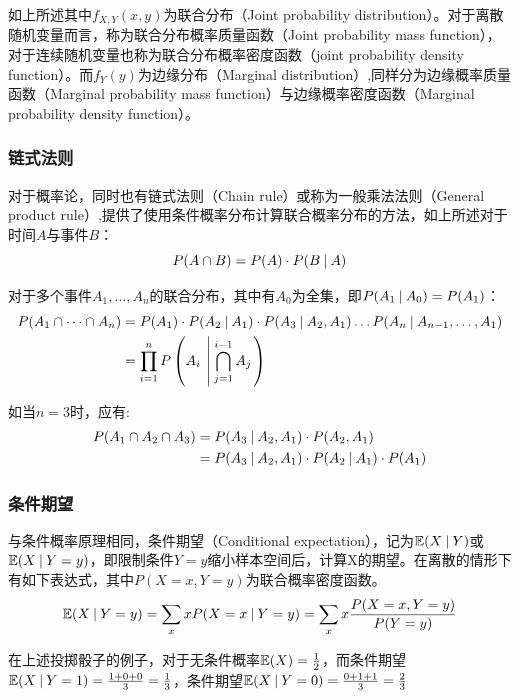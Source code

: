 \documentclass[11pt]{article}
\begin{document}
如上所述其中$f_{X,Y}(x,y)$为联合分布（Joint probability distribution）。对于离散随机变量而言，称为联合分布概率质量函数（Joint probability mass function），对于连续随机变量也称为联合分布概率密度函数（joint probability density function）。而$f_Y(y)$为边缘分布（Marginal distribution）,同样分为边缘概率质量函数（Marginal probability mass function）与边缘概率密度函数（Marginal probability density function）。

\subsubsection{链式法则}

对于概率论，同时也有链式法则（Chain rule）或称为一般乘法法则（General product rule）,提供了使用条件概率分布计算联合概率分布的方法，如上所述对于时间$A$与事件$B$：
\begin{equation*}
    P(A\cap B) = P(A) \cdot P(B\:\vert\: A)
\end{equation*}

对于多个事件$A_1,\dots,A_n$的联合分布，其中有$A_0$为全集，即$P(A_1\:\vert\: A_0) = P(A_1)$：
\begin{align*}
    P(A_1 \cap \dots \cap A_n) &= P(A_1) \cdot P(A_2\:\vert\: A_1) \cdot P(A_3\:\vert\: A_2,A_1) \dots P(A_n\:\vert\: A_{n-1},\dots,A_1) \\
    &= \prod_{i=1}^{n} P \left( A_i \:\left|\:\bigcap_{j=1}^{i-1} A_j \right. \right)
\end{align*}

如当$n=3$时，应有:
\begin{align*}
    P(A_1 \cap A_2 \cap A_3) &= P(A_3 \:\vert\: A_2, A_1) \cdot P(A_2, A_1) \\
    &= P(A_3 \:\vert\: A_2, A_1) \cdot P(A_2\:\vert\: A_1) \cdot P(A_1)
\end{align*}

\subsubsection{条件期望}

与条件概率原理相同，条件期望（Conditional expectation），记为$\mathbb{E}(X\:\vert\: Y)$或$\mathbb{E}(X\:\vert\: Y=y)$，即限制条件$Y=y$缩小样本空间后，计算X的期望。在离散的情形下有如下表达式，其中$P(X=x,Y=y)$为联合概率密度函数。
\begin{equation*}
    \mathbb{E}(X\:\vert\: Y=y) = \sum_x x P(X=x\:\vert\: Y=y) = \sum_x x \frac{P(X=x,Y=y)}{P(Y=y)}
\end{equation*}

\begin{example}
    在上述投掷骰子的例子，对于无条件概率$\mathbb{E}(X) = \frac{1}{2}$，而条件期望$\mathbb{E}(X\:\vert\: Y=1) = \frac{1+0+0}{3} = \frac{1}{3}$，条件期望$\mathbb{E}(X\:\vert\: Y=0) = \frac{0+1+1}{3} = \frac{2}{3}$
\end{example}
\end{document}
